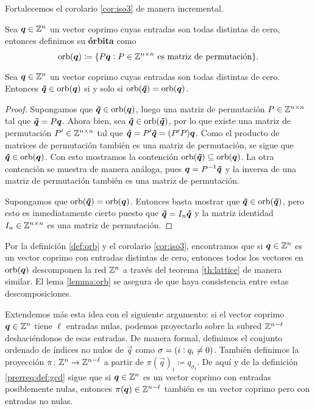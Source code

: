 Fortalecemos el corolario \ref{cor:iso3} de manera incremental.
\begin{definition}
	\label{def:orb}
	Sea $\boldsymbol{q} \in \mathbb{Z}^n$ un vector coprimo cuyas entradas son todas distintas de cero, entonces
	definimos su \textbf{órbita} como
	\begin{equation*}
		\operatorname{orb}(\boldsymbol{q}) \coloneq \lbrace P\boldsymbol{q} \vcentcolon P \in \mathbb{Z}^{n\times n} ~\text{es matriz de
		permutación} \rbrace.
	\end{equation*}
\end{definition}
\begin{lemma}
	\label{lemma:orb}
	Sea $\boldsymbol{q} \in \mathbb{Z}^n$ un vector coprimo cuyas entradas son todas distintas de cero. Entonces
	$\boldsymbol{\tilde{q}} \in \operatorname{orb}(\boldsymbol{q})$ si y solo si $\operatorname{orb}(\boldsymbol{\tilde{q}}) = \operatorname{orb}(\boldsymbol{q})$.
\end{lemma}
\begin{proof}
	Supongamos que $\boldsymbol{\tilde{q}} \in \operatorname{orb}(\boldsymbol{q})$, luego una matriz de permutación $P \in \mathbb{Z}^{n\times
	n}$ tal que $\boldsymbol{\tilde{q}} = P\boldsymbol{q}$. Ahora bien, sea $\boldsymbol{\hat{q}} \in \operatorname{orb}(\boldsymbol{\tilde{q}})$, por lo
	que existe una matriz de permutación $P' \in \mathbb{Z}^{n\times n}$ tal que $\boldsymbol{\hat{q}} = P'\boldsymbol{\tilde{q}}
	= (P'P)\boldsymbol{q}$. Como el producto de matrices de permutación también es una matriz de
	permutación, se sigue que $\boldsymbol{\hat{q}} \in \operatorname{orb}(\boldsymbol{q})$. Con esto mostramos la contención
	$\operatorname{orb}(\boldsymbol{\tilde{q}}) \subseteq \operatorname{orb}(\boldsymbol{q})$. La otra contención se muestra de manera análoga, pues
	$\boldsymbol{q} = P^{-1}\boldsymbol{\tilde{q}}$ y la inversa de una matriz de permutación también es una matriz de
	permutación.

	Supongamos que $\operatorname{orb}(\boldsymbol{\tilde{q}}) = \operatorname{orb}(\boldsymbol{q})$. Entonces basta mostrar que $\boldsymbol{\tilde{q}} \in
	\operatorname{orb}(\boldsymbol{\tilde{q}})$, pero esto es inmediatamente cierto puesto que $\boldsymbol{\tilde{q}} = I_n\boldsymbol{\tilde{q}}$ y la
	matriz identidad $I_n \in \mathbb{Z}^{n \times n}$ es una matriz de permutación.
\end{proof}

Por la definición \ref{def:orb} y el corolario \ref{cor:iso3}, encontramos que si $\boldsymbol{q} \in \mathbb{Z}^n$
es un vector coprimo con entradas distintas de cero, entonces todos los vectores en
$\operatorname{orb}(\boldsymbol{q})$ descomponen la red $\mathbb{Z}^n$ a través del teorema \ref{th:lattice} de manera similar.
El lema \ref{lemma:orb} se asegura de que haya consistencia entre estas descomposiciones.

Extendemos más esta idea con el siguiente argumento: si el vector
coprimo $\boldsymbol{q} \in \mathbb{Z}^n$ tiene $\ell$ entradas nulas, podemos proyectarlo sobre la subred $\mathbb{Z}^{n -
\ell}$ deshaciéndonos de esas entradas. De manera formal, definimos el conjunto ordenado de índices
no nulos de $\vec{q}$ como $\sigma = (i \vcentcolon q_i \neq 0)$. También definimos la proyección
$\pi \colon \mathbb{Z}^n \to \mathbb{Z}^{n - \ell}$ a partir de $\pi(\vec{q})_i \coloneq q_{\sigma_i}$. De aquí y de
la definición \ref{prerreq:def:gcd} sigue que si $\boldsymbol{q} \in \mathbb{Z}^n$ es un vector coprimo con
entradas posiblemente nulas, entonces $\pi(\boldsymbol{q}) \in \mathbb{Z}^{n-\ell}$ también es un vector coprimo
pero con entradas no nulas.


